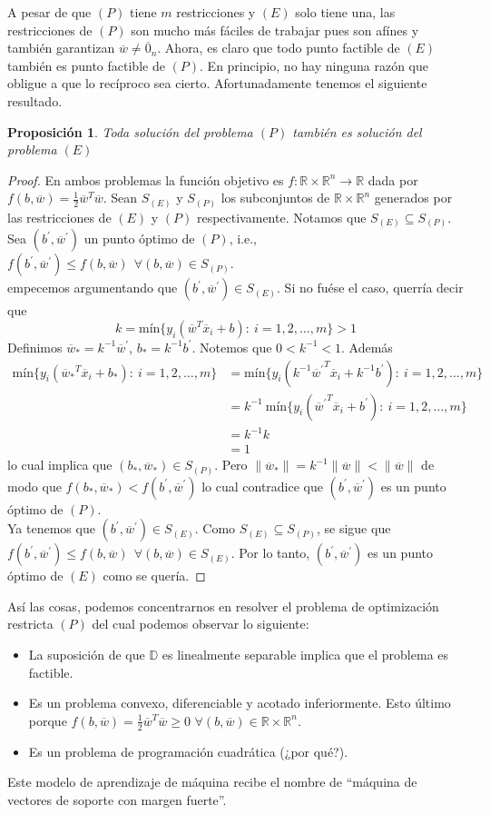 \documentclass[11pt]{article}
\newtheorem{proposition}{Proposición}[section]
\newcommand{\R}{\mathbb{R}}
\newcommand{\Rn}{\R^{n}}
\newcommand{\Rnu}{\R\times\Rn}
\newcommand{\wv}{\overline{w}}
\newcommand{\x}{\overline{x}}
\newcommand{\z}{\overline{0}_{n}}
\newcommand{\Sm}{1,2,\ldots, m}
\newcommand{\bo}{b_{*}}
\newcommand{\bc}{b^{'}}
\newcommand{\wo}{\wv_{*}}
\newcommand{\wc}{\wv^{'}}
\newcommand{\Dat}{\mathbb{D}}
\newcommand{\nw}{\|\wv\|}
\newcommand{\SE}{S_{(E)}}
\newcommand{\SP}{S_{(P)}}
\begin{document}
A pesar de que $(P)$ tiene $m$ restricciones y $(E)$ solo tiene una, las restricciones de $(P)$ son mucho más fáciles de trabajar pues son afínes y también garantizan $\wv\ne\z$. Ahora, es claro que todo punto factible de $(E)$ también es punto factible de $(P)$. En principio, no hay ninguna razón que obligue a que lo recíproco sea cierto. Afortunadamente tenemos el siguiente resultado.

\begin{proposition}
Toda solución del problema $(P)$ también es solución del problema $(E)$
\end{proposition}
\begin{proof}
En ambos problemas la función objetivo es $f:\Rnu\rightarrow\R$ dada por $f(b, \wv)=\frac{1}{2}\wv^{T}\wv$. Sean $\SE$ y $\SP$ los subconjuntos de $\Rnu$ generados por las restricciones de $(E)$ y $(P)$ respectivamente. Notamos que $\SE\subseteq\SP$.\\
Sea $(\bc,\wc)$ un punto óptimo de $(P)$, i.e., $f(\bc, \wc)\leq f(b, \wv)\ \ \forall(b, \wv)\in\SP$.\\
empecemos argumentando que $(\bc, \wc)\in\SE$. Si no fuése el caso, querría decir que
$$k=\text{mín}\{y_{i}(\wv^{T}\x_{i}+b):\ i=\Sm \}>1$$
Definimos $\wo=k^{-1}\wc$, $\bo=k^{-1}\bc$. Notemos que $0<k^{-1}<1$. Además
\begin{equation*}
\begin{aligned}
\text{mín}\{y_{i}({\wo}^{T}\x_{i}+\bo):\ i=\Sm \}&=\text{mín}\{y_{i}(k^{-1}{\wc}^{T}\x_{i}+k^{-1}{\bc}):\ i=\Sm \}\\
&=k^{-1}\ \text{mín}\{y_{i}({\wc}^{T}\x_{i}+{\bc}):\ i=\Sm \}\\
&=k^{-1}k\\
&=1
\end{aligned}
\end{equation*}
lo cual implica que $(\bo, \wo)\in\SP$. Pero $\|\wo \|=k^{-1}\nw<\nw$ de modo que $f(\bo, \wo)<f(\bc, \wc)$ lo cual contradice que $(\bc,\wc)$ es un punto óptimo de $(P)$.\\
Ya tenemos que $(\bc,\wc)\in\SE$. Como $\SE\subseteq\SP$, se sigue que $f(\bc, \wc)\leq f(b, \wv)\ \ \forall(b, \wv)\in\SE$. Por lo tanto, $(\bc,\wc)$ es un punto óptimo de $(E)$ como se quería.
\end{proof}

Así las cosas, podemos concentrarnos en resolver el problema de optimización restricta $(P)$ del cual podemos observar lo siguiente:
\begin{itemize}
\item La suposición de que $\Dat$ es linealmente separable implica que el problema es factible.
\item Es un problema convexo, diferenciable y acotado inferiormente. Esto último porque $f(b, \wv)=\frac{1}{2}\wv^{T}\wv\geq0$ $\forall(b, \wv)\in\Rnu$.
\item Es un problema de programación cuadrática (¿por qué?).
\end{itemize}
Este modelo de aprendizaje de máquina recibe el nombre de ``máquina de vectores de soporte con margen fuerte''.\\
\end{document}
